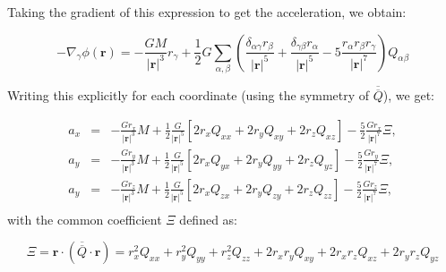 \documentclass[a4paper,10pt]{article}
\newcommand{\rr}{\mathbf{r}}
\begin{document}
Taking the gradient of this expression to get the acceleration, we obtain:

\begin{equation}
 -\nabla_\gamma\phi(\rr)= -\frac{GM}{|\rr|^3} r_\gamma + 
\frac{1}{2}G\sum_{\alpha,\beta}\left(\frac{\delta_{\alpha\gamma}r_\beta}{|\rr|^5} + 
\frac{\delta_{\gamma\beta}r_\alpha}{|\rr|^5} -5\frac{r_\alpha r_\beta r_\gamma}{|\rr|^7}\right)Q_{\alpha\beta}
\end{equation}

Writing this explicitly for each coordinate (using the symmetry of $\overline{\overline{Q}}$), we get:

\begin{eqnarray}
 a_x &=& -\frac{Gr_x}{|\rr|^3}M + \frac{1}{2} \frac{G}{|\rr|^5}\left[2r_x Q_{xx} + 2r_yQ_{xy} + 2r_z Q_{xz}\right] - 
\frac{5}{2} \frac{G r_x}{|\rr|^7} \Xi, \\
 a_y &=& -\frac{Gr_y}{|\rr|^3}M + \frac{1}{2} \frac{G}{|\rr|^5}\left[2r_x Q_{yx} + 2r_yQ_{yy} + 2r_z Q_{yz}\right] - 
\frac{5}{2} \frac{G r_y}{|\rr|^7} \Xi, \\
 a_y &=& -\frac{Gr_z}{|\rr|^3}M + \frac{1}{2} \frac{G}{|\rr|^5}\left[2r_x Q_{zx} + 2r_yQ_{zy} + 2r_z Q_{zz}\right] - 
\frac{5}{2} \frac{G r_z}{|\rr|^7} \Xi, \\
\end{eqnarray}
with the common coefficient $\Xi$ defined as:

\begin{equation*}
 \Xi = \rr\cdot(\overline{\overline{Q}}\cdot \rr) = r_x^2Q_{xx} + r_y^2Q_{yy} + r_z^2Q_{zz} + 2r_xr_yQ_{xy} + 
2r_xr_zQ_{xz} + 2r_yr_zQ_{yz}
\end{equation*}
\end{document}
